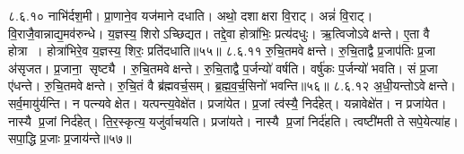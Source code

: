 ८.६.१०
नाभि॑र्दश॒मी। प्रा॒णाने॒व यज॑माने दधाति। अथो॒ दशाक्षरा वि॒राट्। अन्नं॑  वि॒राट्। वि॒राजै॒वान्नाद्य॒मव॑रुन्धे। य॒ज्ञस्य॒ शिरोऽच्छिद्यत। तद्दे॒वा होत्रा॑भिः॒ प्रत्य॑दधुः। ऋ॒त्विजोऽवेक्षन्ते। ए॒ता वै होत्रा। होत्रा॑भिरे॒व य॒ज्ञस्य॒ शिरः॒ प्रति॑दधाति॥५५॥
८.६.११
रु॒चि॒तमवेक्षन्ते। रु॒चि॒ताद्वै प्र॒जाप॑तिः प्र॒जा अ॑सृजत। प्र॒जाना॒ सृष्ट्यै। रु॒चि॒तमवेक्षन्ते। रु॒चि॒ताद्वै प॒र्जन्यो॑ वर्\mbox{}षति। वर्\mbox{}षु॑कः प॒र्जन्यो॑ भवति। सं प्र॒जा ए॑धन्ते। रु॒चि॒तमवेक्षन्ते। रु॒चि॒तं वै ब्र॑ह्मवर्च॒सम्। ब्र॒ह्म॒व॒र्च॒सिनो॑ भवन्ति॥५६॥
८.६.१२
अ॒धी॒यन्तोऽवेक्षन्ते। सर्व॒मायु॑र्\mbox{}यन्ति। न पत्न्यवेक्षेत। यत्पन्त्य॒वेक्षे॑त। प्रजा॑येत। प्र॒जां त्व॑स्यै॒ निर्द॑हेत्। यन्नावेक्षे॑त। न प्रजा॑येत। नास्यै प्र॒जां निर्द॑हेत्। ति॒र॒स्कृत्य॒ यजु॑र्वाचयति। प्रजा॑यते। नास्यै प्र॒जां निर्द॑हति। त्वष्टी॑मती ते सपे॒येत्या॑ह। सपा॒द्धि प्र॒जाः प्र॒जाय॑न्ते॥५७॥
\anuvakamend

